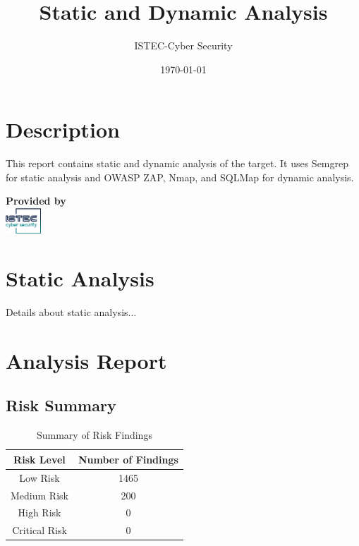 \documentclass[12pt]{article}
\title{\textbf{Static and Dynamic Analysis}}
\author{ISTEC-Cyber Security}
\date{\today} %
\begin{document}
\maketitle

\section*{Description}
This report contains static and dynamic analysis of the target. It uses Semgrep for static analysis and OWASP ZAP, Nmap, and SQLMap for dynamic analysis.

\vspace{10cm} %

\begin{center}
\textbf{Provided by} \\[1em]
\includegraphics[width=0.1\textwidth]{logo75.png}
\end{center}

\newpage %

\section{Static Analysis}
Details about static analysis...

\section{Analysis Report}

\subsection{Risk Summary}
\begin{table}[h!]
\centering
\renewcommand{\arraystretch}{1.5}
\begin{tabular}{|c|c|}
\hline
\textbf{Risk Level} & \textbf{Number of Findings} \\
\hline
Low Risk & 1465 \\ 
\hline
Medium Risk & 200 \\ 
\hline
High Risk & 0 \\ 
\hline
Critical Risk & 0 \\ 
\hline
\end{tabular}
\caption{Summary of Risk Findings}
\label{tab:risk_summary}
\end{table}
\end{document}
